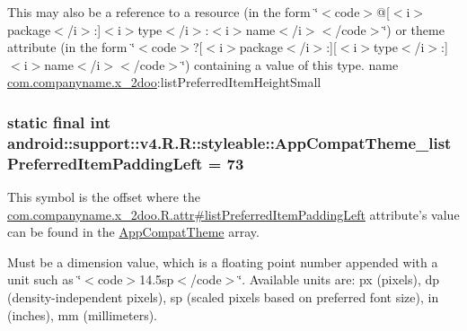 This may also be a reference to a resource (in the form \char`\"{}$<$code$>$@\mbox{[}$<$i$>$package$<$/i$>$:\mbox{]}$<$i$>$type$<$/i$>$:$<$i$>$name$<$/i$>$$<$/code$>$\char`\"{}) or theme attribute (in the form \char`\"{}$<$code$>$?\mbox{[}$<$i$>$package$<$/i$>$:\mbox{]}\mbox{[}$<$i$>$type$<$/i$>$:\mbox{]}$<$i$>$name$<$/i$>$$<$/code$>$\char`\"{}) containing a value of this type.  name \hyperlink{namespacecom_1_1companyname_1_1x__2doo}{com.companyname.x\_\-2doo}:listPreferredItemHeightSmall \hypertarget{classandroid_1_1support_1_1v4_1_1_r_1_1styleable_9cce233669ccd45e691fcd5ebd0a293a}{
\subsubsection[{AppCompatTheme\_\-listPreferredItemPaddingLeft}]{\setlength{\rightskip}{0pt plus 5cm}static final int android::support::v4.R.R::styleable::AppCompatTheme\_\-listPreferredItemPaddingLeft = 73}}
\label{classandroid_1_1support_1_1v4_1_1_r_1_1styleable_9cce233669ccd45e691fcd5ebd0a293a}


This symbol is the offset where the \hyperlink{classcom_1_1companyname_1_1x__2doo_1_1_r_1_1attr_729389e01214590aced340e593326934}{com.companyname.x\_\-2doo.R.attr\#listPreferredItemPaddingLeft} attribute's value can be found in the \hyperlink{classandroid_1_1support_1_1v4_1_1_r_1_1styleable_0873e92ba21076bb5a4aeadeb7f5779f}{AppCompatTheme} array.

Must be a dimension value, which is a floating point number appended with a unit such as \char`\"{}$<$code$>$14.5sp$<$/code$>$\char`\"{}. Available units are: px (pixels), dp (density-independent pixels), sp (scaled pixels based on preferred font size), in (inches), mm (millimeters). 

